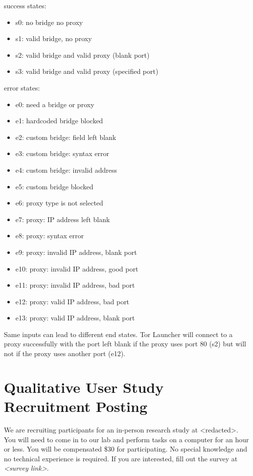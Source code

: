 \documentclass[USenglish,oneside,twocolumn]{article}
\begin{document}
\noindent success states: 
\begin{itemize}
\item s0: no bridge no proxy
\item s1: valid bridge, no proxy
\item s2: valid bridge and valid proxy (blank port)
\item s3: valid bridge and valid proxy (specified port)
\end{itemize}

error states:
\begin{itemize} 
\item e0: need a bridge or proxy
\item e1: hardcoded bridge blocked
\item e2: custom bridge: field left blank
\item e3: custom bridge: syntax error
\item e4: custom bridge: invalid address
\item e5: custom bridge blocked
\item e6: proxy type is not selected
\item e7: proxy: IP address left blank
\item e8: proxy: syntax error
\item e9: proxy: invalid IP address, blank port
\item e10: proxy: invalid IP address, good port
\item e11: proxy: invalid IP address, bad port
\item e12: proxy: valid IP address, bad port
\item e13: proxy: valid IP address, blank port
\end{itemize} 

Same inputs can lead to different end states. Tor Launcher will connect to a proxy successfully with the port left blank if the proxy uses port 80 (s2) but will not if the proxy uses another port (e12). 

\section{Qualitative User Study Recruitment Posting} 
\label{qualitative-recruitment}
We are recruiting participants for an in-person research study at <redacted>. %
You will need to come in to our lab and perform tasks on a computer for an hour or less. You will be compensated \$30 for participating. 
No special knowledge and no technical experience is required. If you are interested, fill out the survey at \textit{<survey link>}. 
\end{document}
